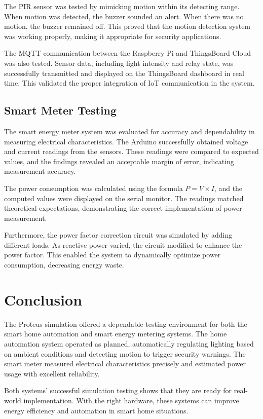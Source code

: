\documentclass[a4paper,12pt]{report}
\begin{document}
 The PIR sensor was tested by mimicking motion within its detecting range.  When motion was detected, the buzzer sounded an alert.  When there was no motion, the buzzer remained off.  This proved that the motion detection system was working properly, making it appropriate for security applications.


The MQTT communication between the Raspberry Pi and ThingsBoard Cloud was also tested. Sensor data, including light intensity and relay state, was successfully transmitted and displayed on the ThingsBoard dashboard in real time. This validated the proper integration of IoT communication in the system.

\subsection{Smart Meter Testing}
The smart energy meter system was evaluated for accuracy and dependability in measuring electrical characteristics.  The Arduino successfully obtained voltage and current readings from the sensors.  These readings were compared to expected values, and the findings revealed an acceptable margin of error, indicating measurement accuracy.

The power consumption was calculated using the formula \( P = V \times I \), and the computed values were displayed on the serial monitor. The readings matched theoretical expectations, demonstrating the correct implementation of power measurement.

Furthermore, the power factor correction circuit was simulated by adding different loads.  As reactive power varied, the circuit modified to enhance the power factor.  This enabled the system to dynamically optimize power consumption, decreasing energy waste.


\section{Conclusion}

The Proteus simulation offered a dependable testing environment for both the smart home automation and smart energy metering systems.  The home automation system operated as planned, automatically regulating lighting based on ambient conditions and detecting motion to trigger security warnings.  The smart meter measured electrical characteristics precisely and estimated power usage with excellent reliability. 

 Both systems' successful simulation testing shows that they are ready for real-world implementation.  With the right hardware, these systems can improve energy efficiency and automation in smart home situations.
\end{document}
